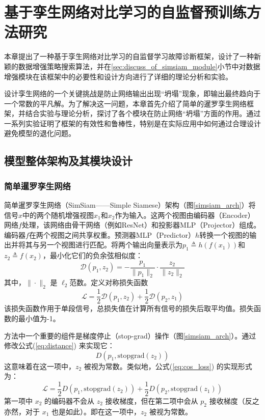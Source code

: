 \documentclass[master]{thesis-uestc}
\begin{document}
\chapter{基于孪生网络对比学习的自监督预训练方法研究}
本章提出了一种基于孪生网络对比学习的自监督学习故障诊断框架，设计了一种新颖的数据增强策略搜索算法，并在\ref{sec:discuss_of_simsiam_module}小节中对数据增强模块在该框架中的必要性和设计方向进行了详细的理论分析和实验。

设计孪生网络的一个关键挑战是防止网络输出出现“坍塌”现象，即输出最终趋向于一个常数的平凡解。为了解决这一问题，本章首先介绍了简单的暹罗孪生网络框架，并结合实验与理论分析，探讨了各个模块在防止网络“坍塌”方面的作用。通过一系列实验证明了框架的有效性和鲁棒性，特别是在实际应用中如何通过合理设计避免模型的退化问题。
\section{模型整体架构及其模块设计}
\subsection{简单暹罗孪生网络}
简单暹罗孪生网络（SimSiam——Simple Siamese）架构（图\ref{simsiam_arch}）将信号$x$中的两个随机增强视图$x_1$和$x_2$作为输入。这两个视图由编码器（Encoder）网络$f$处理，该网络由骨干网络（例如ResNet）和投影器MLP（Projector）组成。编码器$f$在两个视图之间共享权重。预测器MLP（Predictor）$h$转换一个视图的输出并将其与另一个视图进行匹配。将两个输出向量表示为$p_1 \triangleq h(f(x_1))$和$z_2 \triangleq f(x_2)$，最小化它们的负余弦相似度：
\begin{equation}
    \mathcal{D}(p_1, z_2) = -\frac{p_1}{\|p_1\|_2} \cdot \frac{z_2}{\|z_2\|_2}
    \label{eq:distance}
\end{equation}  
其中，$\|\cdot\|_2$ 是 $\ell_2$范数。定义对称损失函数
\begin{equation}
    \mathcal{L} = \frac{1}{2} \mathcal{D}(p_{1}, z_{2}) + \frac{1}{2} \mathcal{D}(p_{2}, z_{1})
\label{eq:cos_loss}
\end{equation}
该损失函数作用于单段信号，总损失值在计算所有信号的损失后取平均值。损失函数的最小值为-1。

方法中一个重要的组件是梯度停止（stop-grad）操作（图\ref{simsiam_arch}）。通过修改公式(\ref{eq:distance}) 来实现它：
\begin{equation}
    D(p_1, \text{stopgrad}(z_2))
\label{eq:stopgrad}
\end{equation}
这意味着在这一项中，\( z_2 \) 被视为常数。类似地，公式(\ref{eq:cos_loss}) 的实现形式为：
\begin{equation}
\mathcal{L} = \frac{1}{2} D(p_1, \text{stopgrad}(z_2)) + \frac{1}{2} D(p_2, \text{stopgrad}(z_1))
\label{eq:cos_loss_stopgrad}
\end{equation}
第一项中 \( x_2 \) 的编码器不会从 \( z_2 \) 接收梯度，但在第二项中会从 \( p_2 \) 接收梯度（反之亦然，对于 \( x_1 \) 也是如此）。即在这一项中，\( z_2 \) 被视为常数。
\end{document}
